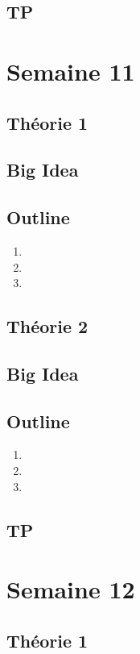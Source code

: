 \documentclass{article}
\begin{document}
\subsection{TP}

\pagebreak
\section{Semaine 11}
\subsection{Théorie 1}
\subsection*{Big Idea}
\subsection*{Outline}
\begin{enumerate}
    \item
    \item
    \item
\end{enumerate}
\subsection{Théorie 2}
\subsection*{Big Idea}
\subsection*{Outline}
\begin{enumerate}
    \item
    \item
    \item
\end{enumerate}
\subsection{TP}

\pagebreak
\section{Semaine 12}
\subsection{Théorie 1}
\end{document}
